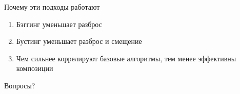\documentclass[10pt]{beamer}
\begin{document}
\begin{frame}{Почему эти подходы работают}
  \begin{enumerate}
    \item Бэггинг уменьшает разброс
    \item Бустинг уменьшает разброс и смещение
    \item Чем сильнее коррелируют базовые алгоритмы, тем менее эффективны композиции
  \end{enumerate}
\end{frame}

\begin{frame}[standout]
  Вопросы?
\end{frame}

\appendix
\end{document}
